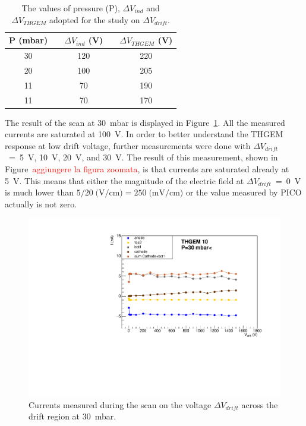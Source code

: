 \documentclass[a4paper, 11 pt]{article}
\newcommand{\Vind}{$\Delta V_{ind}$}
\newcommand{\Vthgem}{$\Delta V_{THGEM}$}
\newcommand{\Vdrift}{$ \Delta V_{drift}$}
\begin{document}
\begin{table} [!h]
	\begin{center}
		\renewcommand{\arraystretch}{1.2}
		\begin{tabular} {ccccc}
			P (mbar) & & \Vind{} (V) & & \Vthgem{} (V)\\
			\toprule[0.1em]
			30	& &	120	& &	220 \\
			20	& &	100	& & 205 \\
			11	& & 70	& & 190 \\
			11	& & 70	& & 170 \\
			
			\bottomrule[0.1em]
		\end{tabular}
	\end{center}
	\caption{The values of pressure (P), \Vind{} and \Vthgem{} adopted for the study on \Vdrift.} \label{tab:FULLTHGEM_vdrift}
\end{table}

The result of the scan at 30~mbar is displayed in Figure~\ref{fig:drift_FULLTHGEM_30mbar}. 
All the measured currents are saturated at 100~V.
In order to better understand the THGEM response at low drift voltage, further measurements were done with \Vdrift~=~5~V, 10~V, 20~V, and 30~V.
The result of this measurement, shown in Figure~\textcolor{red}{aggiungere la figura zoomata}, is that currents are saturated already at 5~V.
This means that either the magnitude of the electric field at \Vdrift~=~0~V is much lower than $5/20\; \mbox{(V/cm)}= 250 \; \mbox{(mV/cm)}$ or the value measured by PICO actually is not zero.
\begin{figure}[htbp]
	\centering
	\includegraphics[width=\textwidth]{Immagini/driftScan_THGEM10_30mbar.pdf}
	\caption{Currents measured during the scan on the voltage \Vdrift{} across the drift region at 30~mbar.}
	\label{fig:drift_FULLTHGEM_30mbar}
\end{figure}
\end{document}
